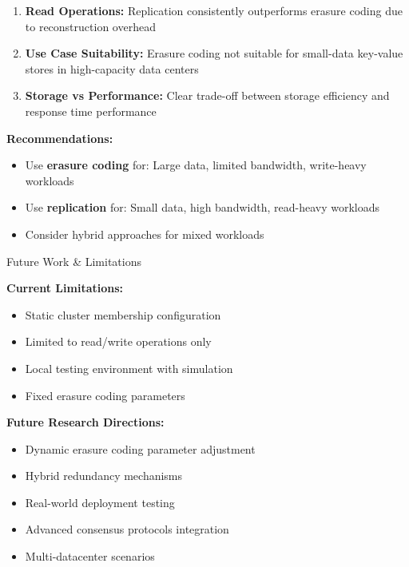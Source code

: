 \documentclass[a2,portrait]{config/poster/a0poster}
\newcommand{\postersection}[1]{%
	\begin{tcolorbox}[
			colback=ITBblue,
			colframe=ITBblue,
			fonttitle=\bfseries,
			coltext=white,
			sharp corners,
			boxrule=0pt,
			top=0pt,
			bottom=0pt,
			halign=center
		]
		\normalsize #1
	\end{tcolorbox}%
}
\begin{document}
\begin{multicols}{4}
\begin{enumerate}
		\item \textbf{Read Operations:} Replication consistently outperforms erasure coding due to reconstruction overhead
		
		\item \textbf{Use Case Suitability:} Erasure coding not suitable for small-data key-value stores in high-capacity data centers
		
		\item \textbf{Storage vs Performance:} Clear trade-off between storage efficiency and response time performance
	\end{enumerate}

	\textbf{Recommendations:}
	\begin{itemize}
		\item Use \textcolor{ECcolor}{\textbf{erasure coding}} for: Large data, limited bandwidth, write-heavy workloads
		\item Use \textcolor{REPcolor}{\textbf{replication}} for: Small data, high bandwidth, read-heavy workloads
		\item Consider hybrid approaches for mixed workloads
	\end{itemize}


	\postersection{Future Work \& Limitations}
	
	\textbf{Current Limitations:}
	\begin{itemize}
		\item Static cluster membership configuration
		\item Limited to read/write operations only
		\item Local testing environment with simulation
		\item Fixed erasure coding parameters
	\end{itemize}

	\textbf{Future Research Directions:}
	\begin{itemize}
		\item Dynamic erasure coding parameter adjustment
		\item Hybrid redundancy mechanisms
		\item Real-world deployment testing
		\item Advanced consensus protocols integration
		\item Multi-datacenter scenarios
	\end{itemize}


\end{multicols}
\end{document}

